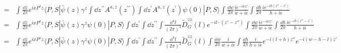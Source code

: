 \documentclass{article}
\newcommand{\mm}[1]{\frac{\dd^4#1}{(2\pi)^4}}
\begin{document}
{\begin{align*}
		= & \int \frac{\dd z}{2 \pi} e^{i x P^{z} z}\langle P, S|\bar{\psi}(z) \gamma^z \int \dd z^{\prime\prime} A^{a,z}\left(z^{\prime\prime}\right)\int \dd z^{\prime} A^{a,z}\left(z^{\prime}\right)  \psi(0)| P, S\rangle\int\frac{\dd w}{2\pi}\frac{ie^{-iwz' }}{w+i\epsilon}\int\frac{\dd h}{2\pi}\frac{ie^{-ih(z''-z') }}{h+i\epsilon} \\
		= & \int \frac{\dd z}{2 \pi} e^{i x P^{z} z}\langle P, S|\bar{\psi}(z) \gamma^z   \psi(0)| P, S\rangle\int \dd z^{\prime} \int \dd z^{\prime\prime} \int\mm{l}\tilde D_G^{zz}(l)e^{-il\cdot(z'-z'')}\int\frac{\dd w}{2\pi}\frac{ie^{-iwz' }}{w+i\epsilon}\int\frac{\dd h}{2\pi}\frac{ie^{-ih(z''-z') }}{h+i\epsilon}                   \\
		= & \int \frac{\dd z}{2 \pi} e^{i x P^{z} z}\langle P, S|\bar{\psi}(z) \gamma^z   \psi(0)| P, S\rangle\int \dd z^{\prime} \int \dd z^{\prime\prime} \int\mm{l}\tilde D_G^{zz}(l)\int\frac{\dd w}{2\pi}\frac{i}{w+i\epsilon}\int\frac{\dd h}{2\pi}\frac{i}{h+i\epsilon}e^{-i(l+h)z''}e^{-i(w-h-l)z'}
	\end{align*}
}
\end{document}
